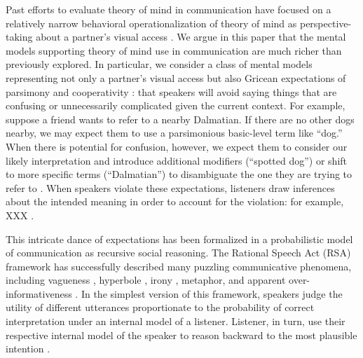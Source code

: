 \documentclass[manuscript]{stjour}
\begin{document}
Past efforts to evaluate theory of mind in communication have focused on a relatively narrow behavioral operationalization of theory of mind as perspective-taking about a partner's visual access \citep{KeysarBarr___Brauner00_TakingPerspective, KeysarLinBarr03_LimitsOnTheoryOfMindUse, LinKeysarEpley10_ReflexivelyMindblind}. 
We argue in this paper that the mental models supporting theory of mind use in communication are much richer than previously explored. 
In particular, we consider a class of mental models representing not only a partner's visual access but also Gricean expectations of parsimony and cooperativity \citep{Grice75_LogicConversation}: that speakers will avoid saying things that are confusing or unnecessarily complicated given the current context. 
For example, suppose a friend wants to refer to a nearby Dalmatian. 
If there are no other dogs nearby, we may expect them to use a parsimonious basic-level term like ``dog.''
When there is potential for confusion, however, we expect them to consider our likely interpretation and introduce additional modifiers (``spotted dog'') or shift to more specific terms (``Dalmatian'') to disambiguate the one they are trying to refer to \citep{BrennanClark96_ConceptualPactsConversation, VanDeemter16_ComputationalModelsOfReferring, GrafEtAl16_BasicLevel}. 
When speakers violate these expectations, listeners draw inferences about the intended meaning in order to account for the violation: for example, XXX \cite{XXX, BrehenyKatsosWilliams06_ImplicaturesOnline, StillerGoodmanFrank15_AdHocImplicature}. 

This intricate dance of expectations has been formalized in a probabilistic model of communication as recursive social reasoning. The Rational Speech Act (RSA) framework has successfully described many puzzling communicative phenomena, including vagueness \cite{Lassiter}, hyperbole \cite{Kao}, irony \cite{}, metaphor, and apparent over-informativeness \cite{Judith}. In the simplest version of this framework, speakers judge the utility of different utterances proportionate to the probability of correct interpretation under an internal model of a listener. Listener, in turn, use their respective internal model of the speaker to reason backward to the most plausible intention \cite{Grice75_LogicConversation,Clark96_UsingLanguage,GoodmanFrank16_RSATiCSFrankGoodman12_PragmaticReasoningLanguageGames, GoodmanStuhlmuller13_KnowledgeImplicature}. 
\end{document}
